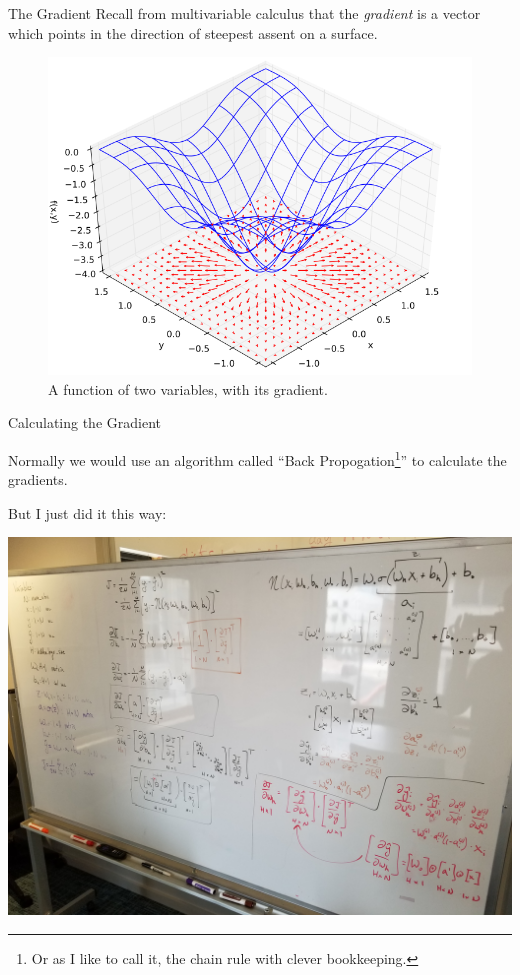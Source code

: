 \documentclass[11pt]{beamer}
\begin{document}
\begin{frame}{The Gradient}
Recall from multivariable calculus that the \emph{gradient} is a vector which points in the direction of steepest assent on a surface.
\begin{center}
\begin{figure}
\includegraphics[scale=0.25]{720px-Gradient_Visual}
\caption{A function of two variables, with its gradient.}
\end{figure}
\end{center}
\end{frame}

\begin{frame}{Calculating the Gradient}

Normally we would use an algorithm called ``Back Propogation\footnote{Or as I like to call it, the chain rule with clever bookkeeping.}'' to calculate the gradients.

\bigskip

But I just did it this way:

\begin{center}
\includegraphics[scale=0.04]{20180305_112255}
\end{center}

\end{frame}
\end{document}
